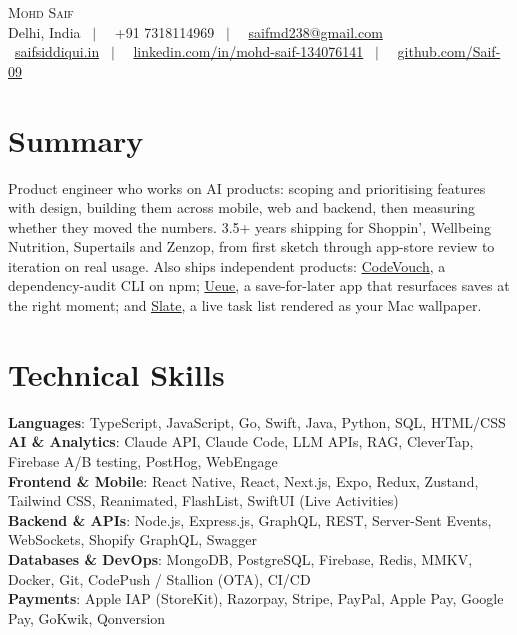 \documentclass[letterpaper,9pt]{extarticle}
\newcommand{\summaryBody}{Full stack developer with 3.5+ years building and launching products end to end: React Native apps on iOS and Android, Next.js web, and the Node.js backends behind them. Shipped apps for Shoppin', Wellbeing Nutrition, Supertails and Zenzop, owning architecture, native integrations, real-time features and payments.}
\newcommand{\skillsOrder}{\skillBackend \\ \skillMobile \\ \skillAI}
\renewcommand{\summaryBody}{React Native developer with 3.5+ years shipping iOS and Android apps end to end, from architecture and native modules through app-store release, backed by the Node.js services behind them. Shipped apps for Shoppin', Wellbeing Nutrition, Supertails and Zenzop, owning native integrations, performance and real-time features.}%
\renewcommand{\skillsOrder}{\skillMobile \\ \skillBackend \\ \skillAI}%
\renewcommand{\summaryBody}{Full stack developer with 3.5+ years shipping AI-powered products end to end, from LLM pipelines and real-time streaming to the React Native and Next.js clients on top of them. Shipped apps for Shoppin', Wellbeing Nutrition, Supertails and Zenzop, owning architecture, real-time features and payments.}%
\renewcommand{\skillsOrder}{\skillAI \\ \skillBackend \\ \skillMobile}%
\renewcommand{\summaryBody}{Product engineer who works on AI products: scoping and prioritising features with design, building them across mobile, web and backend, then measuring whether they moved the numbers. 3.5+ years shipping for Shoppin', Wellbeing Nutrition, Supertails and Zenzop, from first sketch through app-store review to iteration on real usage.}%
\renewcommand{\skillsOrder}{\skillAI \\ \skillMobile \\ \skillBackend}%
\newcommand{\link}[2]{\href{#1}{\underline{#2}}}
\newcommand{\skillMobile}{\textbf{Frontend \& Mobile}: React Native, React, Next.js, Expo, Redux, Zustand, Tailwind CSS, Reanimated, FlashList, SwiftUI (Live Activities)}
\newcommand{\skillBackend}{\textbf{Backend \& APIs}: Node.js, Express.js, GraphQL, REST, Server-Sent Events, WebSockets, Shopify GraphQL, Swagger}
\newcommand{\skillAI}{\textbf{AI \& Analytics}: Claude API, Claude Code, LLM APIs, RAG, CleverTap, Firebase A/B testing, PostHog, WebEngage}
\begin{document}
\begin{center}
    {\LARGE \scshape Mohd Saif} \\ \vspace{3pt}
    \small
    Delhi, India \, $|$ \,
    \faPhone* \, +91 7318114969 \, $|$ \,
    \faEnvelope \, \href{mailto:saifmd238@gmail.com}{saifmd238@gmail.com} \\ \vspace{2pt}
    \small
    \faGlobe \, \href{https://saifsiddiqui.in}{saifsiddiqui.in} \, $|$ \,
    \faLinkedin \, \href{https://linkedin.com/in/mohd-saif-134076141/}{linkedin.com/in/mohd-saif-134076141} \, $|$ \,
    \faGithub \, \href{https://github.com/Saif-09}{github.com/Saif-09}
\end{center}
\vspace{-6pt}

\section{Summary}
\begin{itemize}[leftmargin=0.15in, label={}, topsep=2pt, parsep=0pt, itemsep=0pt]
  \small{\item{
    \summaryBody{}  Also ships independent products: \link{https://www.npmjs.com/package/codevouch}{CodeVouch}, a dependency-audit CLI on npm; \link{https://ueue.ziyarex.com/}{Ueue}, a save-for-later app that resurfaces saves at the right moment; and \link{https://saifsiddiqui.in/work/slate/}{Slate}, a live task list rendered as your Mac wallpaper.
  }}
\end{itemize}
\vspace{-13pt}

\section{Technical Skills}
\begin{itemize}[leftmargin=0.15in, label={}, topsep=2pt, parsep=0pt, itemsep=0pt]
  \small{\item{
    \textbf{Languages}: TypeScript, JavaScript, Go, Swift, Java, Python, SQL, HTML/CSS \\
    \skillsOrder \\
    \textbf{Databases \& DevOps}: MongoDB, PostgreSQL, Firebase, Redis, MMKV, Docker, Git, CodePush / Stallion (OTA), CI/CD \\
    \textbf{Payments}: Apple IAP (StoreKit), Razorpay, Stripe, PayPal, Apple Pay, Google Pay, GoKwik, Qonversion
  }}
\end{itemize}
\vspace{-13pt}
\end{document}
